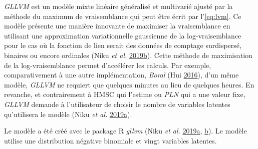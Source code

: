 \documentclass[12pt,]{article}
\begin{document}
\emph{GLLVM} est un modèle mixte linéaire généralisé et multivarié
ajusté par la méthode du maximum de vraisemblance qui peut être écrit
par l'\cref{eq:lvm}. Ce modèle présente une manière innovante de
maximiser la vraisemblance en utilisant une approximation variationnelle
gaussienne de la log-vraisemblance pour le cas où la fonction de lien
serait des données de comptage surdispersé, binaires ou encore ordinales
(Niku \emph{et al.}
\protect\hyperlink{ref-Niku_2019}{2019}\protect\hyperlink{ref-Niku_2019}{b}).
Cette méthode de maximisation de la log-vraisemblance permet d'accélérer
les calculs. Par exemple, comparativement à une autre implémentation,
\emph{Boral} (Hui \protect\hyperlink{ref-Hui_2016}{2016}), d'un même
modèle, \emph{GLLVM} ne requiert que quelques minutes au lieu de
quelques heures. En revanche, et contrairement à HMSC qui l'estime ou
\emph{PLN} qui a une valeur fixe, \emph{GLLVM} demande à l'utilisateur
de choisir le nombre de variables latentes qu'utilisera le modèle (Niku
\emph{et al.}
\protect\hyperlink{ref-Gllvm_2019}{2019}\protect\hyperlink{ref-Gllvm_2019}{a}).

Le modèle a été créé avec le package R \emph{gllvm} (Niku \emph{et al.}
\protect\hyperlink{ref-Gllvm_2019}{2019}\protect\hyperlink{ref-Gllvm_2019}{a},
\protect\hyperlink{ref-Niku_2019}{b}). Le modèle utilise une
distribution négative binomiale et vingt variables latentes.
\end{document}
